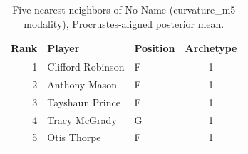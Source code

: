 \begin{table}[htbp]
  \centering\small
  \begin{tabular}{rllc}
    \toprule
    Rank & Player & Position & Archetype \\
    \midrule
    1 & Clifford Robinson & F & 1 \\
    2 & Anthony Mason & F & 1 \\
    3 & Tayshaun Prince & F & 1 \\
    4 & Tracy McGrady & G & 1 \\
    5 & Otis Thorpe & F & 1 \\
    \bottomrule
  \end{tabular}
  \caption{Five nearest neighbors of No Name (curvature_m5 modality), Procrustes-aligned posterior mean.}
  \label{tab:No_Name_neighbors_curvature_m5}
\end{table}

